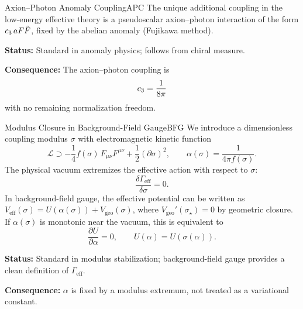 \begin{axiom}{Axion--Photon Anomaly Coupling}{APC}
The unique additional coupling in the low-energy effective theory is a 
pseudoscalar axion--photon interaction of the form $c_3\, a F\tilde{F}$, 
fixed by the abelian anomaly (Fujikawa method).

\tcblower
\textbf{Status:} Standard in anomaly physics; follows from chiral measure.

\textbf{Consequence:} The axion--photon coupling is
\begin{equation}
    c_3 = \frac{1}{8\pi}
\end{equation}
with no remaining normalization freedom.
\end{axiom}

\begin{axiom}{Modulus Closure in Background-Field Gauge}{BFG}
We introduce a dimensionless coupling modulus $\sigma$ with electromagnetic kinetic function
\begin{equation}
    \mathcal{L} \supset -\frac{1}{4} f(\sigma)\,F_{\mu\nu}F^{\mu\nu}
    + \frac{1}{2}(\partial\sigma)^2,
    \qquad 
    \alpha(\sigma)=\frac{1}{4\pi f(\sigma)}.
\end{equation}
The physical vacuum extremizes the effective action with respect to $\sigma$:
\begin{equation}
    \frac{\delta\Gamma_{\mathrm{eff}}}{\delta\sigma}=0.
\end{equation}
In background-field gauge, the effective potential can be written as
$V_{\mathrm{eff}}(\sigma)=U(\alpha(\sigma)) + V_{\mathrm{geo}}(\sigma)$, where
$V_{\mathrm{geo}}'(\sigma_\star)=0$ by geometric closure.
If $\alpha(\sigma)$ is monotonic near the vacuum, this is equivalent to
\begin{equation}
    \frac{\partial U}{\partial \alpha}=0,
    \qquad U(\alpha)=U(\sigma(\alpha)).
\end{equation}

\tcblower
\textbf{Status:} Standard in modulus stabilization; background-field gauge provides a clean definition of $\Gamma_{\mathrm{eff}}$.

\textbf{Consequence:} $\alpha$ is fixed by a modulus extremum, not treated as a variational constant.
\end{axiom}

